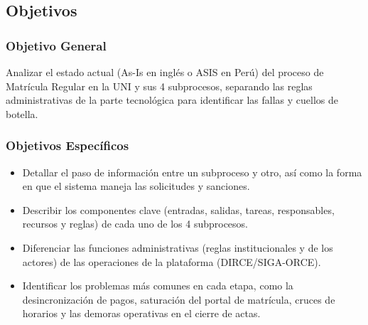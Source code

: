 \subsection{Objetivos}

\subsubsection{Objetivo General}

Analizar el estado actual (As-Is en inglés o ASIS en Perú) del proceso de Matrícula Regular en la UNI y sus 4 subprocesos, separando las reglas administrativas de la parte tecnológica para identificar las fallas y cuellos de botella.

\subsubsection{Objetivos Específicos}
\begin{itemize}
\item Detallar el paso de información entre un subproceso y otro, así como la forma en que el sistema maneja las solicitudes y sanciones.
\item Describir los componentes clave (entradas, salidas, tareas, responsables, recursos y reglas) de cada uno de los 4 subprocesos.
\item Diferenciar las funciones administrativas (reglas institucionales y de los actores) de las operaciones de la plataforma (DIRCE/SIGA-ORCE).
\item Identificar los problemas más comunes en cada etapa, como la desincronización de pagos, saturación del portal de matrícula, cruces de horarios y las demoras operativas en el cierre de actas.
\end{itemize}